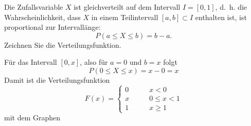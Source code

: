 Die Zufallsvariable $X$ ist gleichverteilt auf dem Intervall $I=[0,1]$,
d.~h. die Wahrscheinlichkeit, dass $X$ in einem Teilintervall $[a,b]\subset I$
enthalten ist, ist
proportional zur Intervallänge:
\[
P(a\le X\le b) = b-a.
\]
Zeichnen Sie die Verteilungsfunktion.

\begin{loesung}
Für das Intervall $[0,x]$, also für $a=0$ und $b=x$ folgt
\[
P(0\le X\le x)
=
x-0
=
x
\]
Damit ist die Verteilungsfunktion
\[
F(x)
=
\begin{cases}
0&\qquad x < 0\\
x&\qquad 0\le x < 1\\
1&\qquad x \ge 1
\end{cases}
\]
mit dem Graphen 
\begin{center}
\end{center}
\end{loesung}

